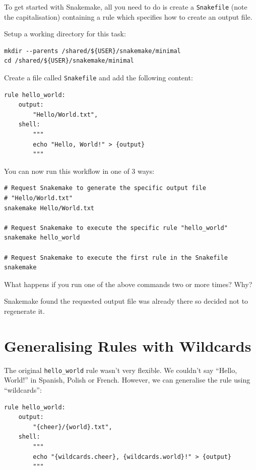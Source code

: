 To get started with Snakemake, all you need to do is create a \texttt{Snakefile} (note the capitalisation) containing a rule
which specifies how to create an output file.

Setup a working directory for this task:

\begin{lstlisting}
mkdir --parents /shared/${USER}/snakemake/minimal
cd /shared/${USER}/snakemake/minimal
\end{lstlisting}

Create a file called \texttt{Snakefile} and add the following content:

\begin{lstlisting}
rule hello_world:
	output:
		"Hello/World.txt",
	shell:
		"""
		echo "Hello, World!" > {output}
		"""
\end{lstlisting}

You can now run this workflow in one of 3 ways:

\begin{lstlisting}
# Request Snakemake to generate the specific output file
# "Hello/World.txt"
snakemake Hello/World.txt

# Request Snakemake to execute the specific rule "hello_world"
snakemake hello_world

# Request Snakemake to execute the first rule in the Snakefile
snakemake
\end{lstlisting}

\begin{questions}

What happens if you run one of the above commands two or more times? Why?

\begin{answer}
Snakemake found the requested output file was already there so decided not to regenerate it.
\end{answer}

\end{questions}


\section{Generalising Rules with Wildcards}

The original \texttt{hello\_world} rule wasn't very flexible. We couldn't say ``Hello, World!'' in Spanish, Polish
or French. However, we can generalise the rule using ``wildcards'':

\begin{lstlisting}
rule hello_world:
	output:
		"{cheer}/{world}.txt",
	shell:
		"""
		echo "{wildcards.cheer}, {wildcards.world}!" > {output}
		"""
\end{lstlisting}

